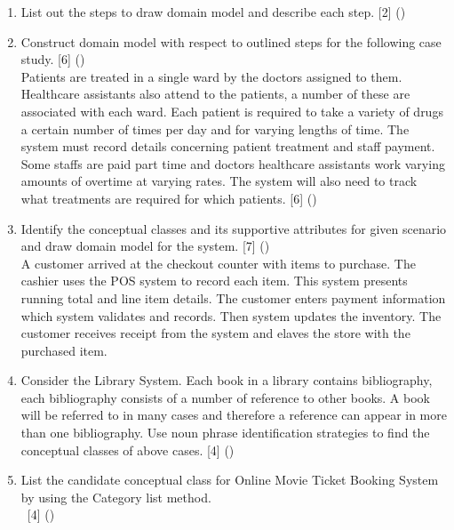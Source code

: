 \documentclass[12pt]{article}
\newcommand{\enter}{\\\textcolor{white}{1}}
\begin{document}
\begin{enumerate}
      \item List out the steps to draw domain model and describe each step. \hfill [2] ()

      \item Construct domain model with respect to outlined steps for the following case study. \hfill [6] ()\\
        Patients are treated in a single ward by the doctors assigned to them. Healthcare assistants also attend to the patients, a number of these are associated with each ward. Each patient is required to take a variety of drugs a certain number of times per day and for varying lengths of time. The system must record details concerning patient treatment and staff payment. Some staffs are paid part time and doctors healthcare assistants work varying amounts of overtime at varying rates. The system will also need to track what treatments are required for which patients. \hfill [6] ()

      \item Identify the conceptual classes and its supportive attributes for given scenario and draw domain model for the system. \hfill [7] ()\\
        A customer arrived at the checkout counter with items to purchase. The cashier uses the POS system to record each item. This system presents running total and line item details. The customer enters payment information which system validates and records. Then system updates the inventory. The customer receives receipt from the system and elaves the store with the purchased item.

      \item Consider the Library System. Each book in a library contains bibliography, each bibliography consists of a number of reference to other books. A book will be referred to in many cases and therefore a reference can appear in more than one bibliography. Use noun phrase identification strategies to find the conceptual classes of above cases. \hfill [4] ()

      \item List the candidate conceptual class for Online Movie Ticket Booking System by using the Category list method.
        \enter\hfill [4] ()
    \end{enumerate}
\end{document}
